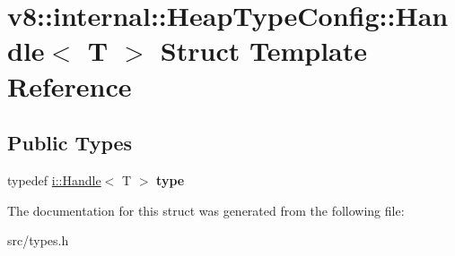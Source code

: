 \hypertarget{structv8_1_1internal_1_1_heap_type_config_1_1_handle}{}\section{v8\+:\+:internal\+:\+:Heap\+Type\+Config\+:\+:Handle$<$ T $>$ Struct Template Reference}
\label{structv8_1_1internal_1_1_heap_type_config_1_1_handle}
\subsection*{Public Types}
\begin{DoxyCompactItemize}
\item 
\hypertarget{structv8_1_1internal_1_1_heap_type_config_1_1_handle_a88b12d7da5b493a92df7b9d3aba77378}{}typedef \hyperlink{classv8_1_1internal_1_1_handle}{i\+::\+Handle}$<$ T $>$ {\bfseries type}\label{structv8_1_1internal_1_1_heap_type_config_1_1_handle_a88b12d7da5b493a92df7b9d3aba77378}

\end{DoxyCompactItemize}


The documentation for this struct was generated from the following file\+:\begin{DoxyCompactItemize}
\item 
src/types.\+h\end{DoxyCompactItemize}
